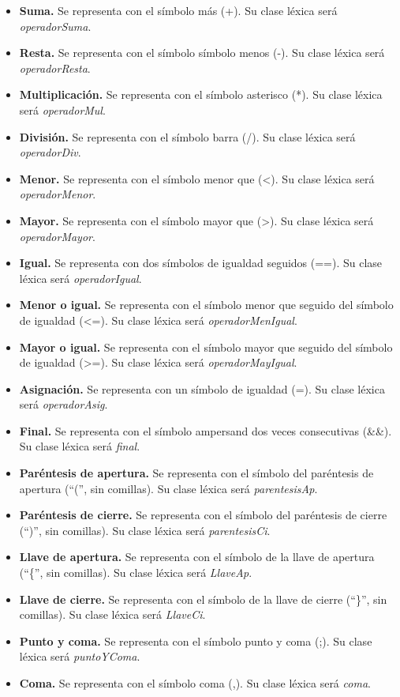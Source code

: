 \begin{itemize}
    \item \textbf{Suma.} Se representa con el símbolo más (+). Su clase léxica será \textit{operadorSuma}.
    \item \textbf{Resta.} Se representa con el símbolo símbolo menos (-). Su clase léxica será \textit{operadorResta}.
    \item \textbf{Multiplicación.} Se representa con el símbolo asterisco (*). Su clase léxica será \textit{operadorMul}.
    \item \textbf{División.} Se representa con el símbolo barra (/). Su clase léxica será \textit{operadorDiv}.
    \item \textbf{Menor.} Se representa con el símbolo menor que (<). Su clase léxica será \textit{operadorMenor}.
    \item \textbf{Mayor.} Se representa con el símbolo mayor que (>). Su clase léxica será \textit{operadorMayor}.
    \item \textbf{Igual.} Se representa con dos símbolos de igualdad seguidos (==). Su clase léxica será \textit{operadorIgual}.
    \item \textbf{Menor o igual.} Se representa con el símbolo menor que seguido del símbolo de igualdad (<=). Su clase léxica será \textit{operadorMenIgual}.
    \item \textbf{Mayor o igual.} Se representa con el símbolo mayor que seguido del símbolo de igualdad (>=). Su clase léxica será \textit{operadorMayIgual}.
    \item \textbf{Asignación.} Se representa con un símbolo de igualdad (=). Su clase léxica será \textit{operadorAsig}.
    \item \textbf{Final.} Se representa con el símbolo ampersand dos veces consecutivas (\&\&). Su clase léxica será \textit{final}.
    \item \textbf{Paréntesis de apertura.} Se representa con el símbolo del paréntesis de apertura (``('', sin comillas). Su clase léxica será \textit{parentesisAp}.
    \item \textbf{Paréntesis de cierre.} Se representa con el símbolo del paréntesis de cierre (``)'', sin comillas). Su clase léxica será \textit{parentesisCi}.
    \item \textbf{Llave de apertura.} Se representa con el símbolo de la llave de apertura (``\{'', sin comillas). Su clase léxica será \textit{LlaveAp}.
    \item \textbf{Llave de cierre.} Se representa con el símbolo de la llave de cierre (``\}'', sin comillas). Su clase léxica será \textit{LlaveCi}.
    \item \textbf{Punto y coma.} Se representa con el símbolo punto y coma (;). Su clase léxica será \textit{puntoYComa}.
    \item \textbf{Coma.} Se representa con el símbolo coma (,). Su clase léxica será \textit{coma}.
\end{itemize}
